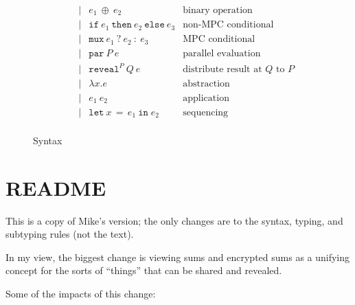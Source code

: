 \documentclass[10pt]{article}
\newcommand{\kw}[1]{\ensuremath{\mathtt{#1}}}
\newcommand{\ebinop}[2]{\ensuremath{{#1}~\oplus~{#2}}}
\newcommand{\elet}[3]{\ensuremath{\kw{let}~#1\, =\, #2~\kw{in}\;{#3}}}
\newcommand{\epar}[2]{\ensuremath{\kw{par}~{#1}~{#2}}}
\newcommand{\esec}[2]{\ensuremath{\kw{sec}~{#1}~{#2}}}
\newcommand{\ereveal}[3]{\ensuremath{\kw{reveal}^{#1}~{#2}~{#3}}}
\newcommand{\econd}[3]{\ensuremath{\kw{if}~{#1}~\kw{then}~{#2}~\kw{else}~{#3}}}
\newcommand{\emux}[3]{\ensuremath{\kw{mux}~{#1}~\kw{?}~{#2}~\kw{:}~{#3}}}
\newcommand{\elam}[2]{\ensuremath{\lambda {#1}.{#2}}}
\newcommand{\eapp}[2]{\ensuremath{{#1}~{#2}}}
\begin{document}
\begin{figure}[h]
\[\begin{array}{rlcll}
                       && \mid & \ebinop{e_1}{e_2}  & \text{binary operation} \\
                       && \mid & \econd{e_1}{e_2}{e_3}  & \text{non-MPC conditional} \\
                       && \mid & \emux{e_1}{e_2}{e_3}  & \text{MPC conditional} \\
                       && \mid & \epar{P}{e} & \text{parallel evaluation}\\
                       && \mid & \ereveal{P}{Q}{e} & \text{distribute result at $Q$ to $P$}\\
                       && \mid & \elam{x}{e}  & \text{abstraction} \\
                       && \mid & \eapp{e_1}{e_2}  & \text{application} \\
                       && \mid & \elet{x}{e_1}{e_2}  & \text{sequencing} \\
  \end{array}
  \]
  \caption{Syntax}
  \label{fig:syntax}
\end{figure}

\section{README}

This is a copy of Mike's version; the only changes are to the syntax, typing, and subtyping rules (not the text).

In my view, the biggest change is viewing sums and encrypted sums as a unifying concept for the sorts of ``things'' that can be shared and revealed.

Some of the impacts of this change:
\end{document}
